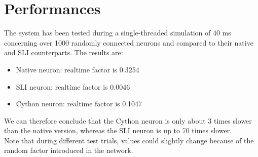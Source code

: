 \documentclass{article}
\begin{document}
\section{Performances}
The system has been tested during a single-threaded simulation of 40 ms concerning over 1000 randomly connected neurons and compared to their native and SLI counterparts. The results are:
\begin{itemize}
\item Native neuron: realtime factor is 0.3254
\item SLI neuron: realtime factor is 0.0046
\item Cython neuron: realtime factor is 0.1047
\end{itemize}
We can therefore conclude that the Cython neuron is only about 3 times slower than the native version, whereas the SLI neuron is up to 70 times slower.\\
Note that during different test trials, values could slightly change because of the random factor introduced in the network.\\
\end{document}

